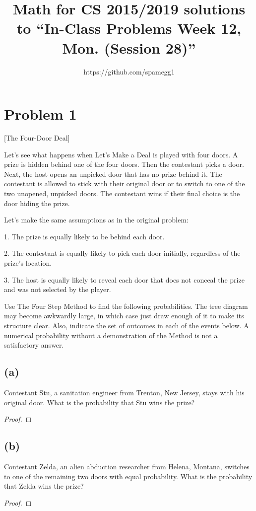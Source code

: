 \documentclass[14pt]{extarticle}
\title{Math for CS 2015/2019 solutions to ``In-Class Problems Week 12, Mon. (Session 28)''}
\author{https://github.com/spamegg1}
\begin{document}
\maketitle
\tableofcontents

\section{Problem 1}
[The Four-Door Deal]

Let’s see what happens when Let’s Make a Deal is played with four doors. A prize is hidden behind one of the four doors. Then the contestant picks a door. Next, the host opens an unpicked door that has no prize behind it. The contestant is allowed to stick with their original door or to switch to one of the two unopened,
unpicked doors. The contestant wins if their final choice is the door hiding the prize.

Let’s make the same assumptions as in the original problem:

1. The prize is equally likely to be behind each door.

2. The contestant is equally likely to pick each door initially, regardless of the prize’s location.

3. The host is equally likely to reveal each door that does not conceal the prize and was not selected by the player.

Use The Four Step Method to find the following probabilities. The tree diagram may become awkwardly large, in which case just draw enough of it to make its structure clear. Also, indicate the set of outcomes in each of the events below. A numerical probability without a demonstration of the Method is not a satisfactory
answer.

\subsection{(a)}
Contestant Stu, a sanitation engineer from Trenton, New Jersey, stays with his original door. What is the probability that Stu wins the prize?
\begin{proof}
\end{proof}

\subsection{(b)}
Contestant Zelda, an alien abduction researcher from Helena, Montana, switches to one of the remaining two doors with equal probability. What is the probability that Zelda wins the prize?
\begin{proof}
\end{proof}
\end{document}
